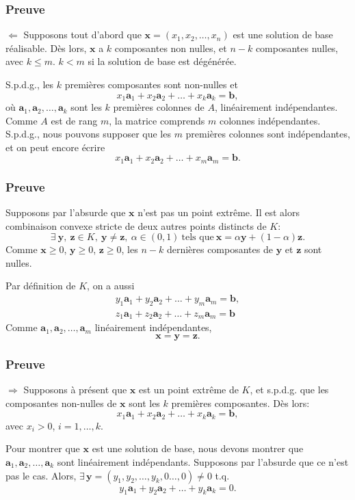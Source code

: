 \documentclass[usepdftitle=false]{beamer}
\def\ba{\boldsymbol{a}}
\def\bb{\boldsymbol{b}}
\def\bx{\boldsymbol{x}}
\def\by{\boldsymbol{y}}
\def\bz{\boldsymbol{z}}
\begin{document}
\begin{frame}
\frametitle{Preuve}

$\Leftarrow$ Supposons tout d'abord que $\bx = (x_1, x_2, \ldots, x_n)$ est une solution de base réalisable.
Dès lors, $\bx$ a $k$ composantes non nulles, et $n-k$ composantes nulles, avec $k \leq m$. $k < m$ si la solution de base est dégénérée.

\mbox{}

S.p.d.g., les $k$ premières composantes sont non-nulles et
\[
  x_1 \ba_1 + x_2 \ba_2 + \ldots + x_k \ba_k = \bb,
\]
où $\ba_1, \ba_2, \ldots, \ba_k$ sont les $k$ premières colonnes de $A$, linéairement indépendantes. Comme $A$ est de rang $m$, la matrice comprends $m$ colonnes indépendantes. S.p.d.g., nous pouvons supposer que les $m$ premières colonnes sont indépendantes, et on peut encore écrire
\[
x_1 \ba_1 + x_2 \ba_2 + \ldots + x_m \ba_m = \bb.
\]

\end{frame}

\begin{frame}
\frametitle{Preuve}

Supposons par l'absurde que $\bx$ n'est pas un point extrême. Il est alors combinaison convexe stricte de deux autres points distincts de $K$:
\[
\exists \ \by,\ \bz \in K,\ \by \ne \bz, \ \alpha \in (0,1) \ \mbox{tels que}\ \bx = \alpha \by + (1-\alpha) \bz.
\]
Comme $\bx \geq 0$, $\by \geq 0$, $\bz \geq 0$, les $n-k$ dernières composantes de $\by$ et $\bz$ sont nulles.

\mbox{}

Par définition de $K$, on a aussi
\begin{align*}
y_1 \ba_1 + y_2 \ba_2 + \ldots + y_m \ba_m = \bb, \\
z_1 \ba_1 + z_2 \ba_2 + \ldots + z_m \ba_m = \bb
\end{align*}
Comme $\ba_1, \ba_2, \ldots, \ba_m$ linéairement indépendantes,
\[
\bx = \by = \bz.
\]

\end{frame}

\begin{frame}
\frametitle{Preuve}

$\Rightarrow$ Supposons à présent que $\bx$ est un point extrême de $K$, et s.p.d.g. que les composantes non-nulles de $\bx$ sont les $k$ premières composantes. Dès lors:
\[
x_1 \ba_1 + x_2 \ba_2 + \ldots + x_k \ba_k = \bb,
\]
avec $x_i > 0$, $i = 1,\ldots,k$.

\mbox{}

Pour montrer que $\bx$ est une solution de base, nous devons montrer que $\ba_1, \ba_2,\ldots, \ba_k$ sont linéairement indépendants. Supposons par l'absurde que ce n'est pas le cas. Alors, $\exists\, \by = ( y_1, y_2,\ldots,y_k,0\ldots,0) \ne 0$ t.q.
\[
y_1 \ba_1 + y_2 \ba_2 + \ldots + y_k \ba_k = 0.
\]

\end{frame}
\end{document}
